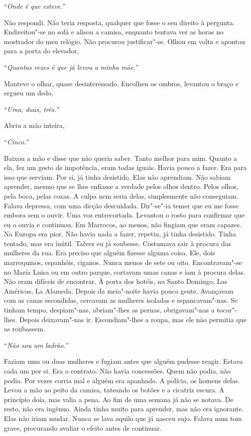 ``\emph{Onde é que esteve.}''

Não respondi. Não teria resposta, qualquer que fosse o seu direito à
pergunta. Endireitou"-se no sofá e alisou a camisa, enquanto tentava ver
as horas no mostrador do meu relógio. Não procurou justificar"-se. Olhou
em volta e apontou para a porta do elevador,

``\emph{Quantas vezes é que já levou a minha mãe.}''

Manteve o olhar, quase desinteressado. Encolheu os ombros, levantou o
braço e ergueu um dedo,

``\emph{Uma, duas, três.''}

Abriu a mão inteira,

``\emph{Cinco.}''

Baixou a mão e disse que não queria saber. Tanto melhor para mim. Quanto
a ela, fez um gesto de impotência, eram todas iguais. Havia pouco a
fazer. Era para isso que serviam. Por si, já tinha desistido. Elas não
aprendiam. Não sabiam aprender, mesmo que se lhes enfiasse a verdade
pelos olhos dentro. Pelos olhos, pela boca, pelas coxas. A culpa nem
seria delas, simplesmente não conseguiam. Falava depressa, com uma
dicção descuidada. Dir"-se"-ia temer que eu me fosse embora sem o ouvir.
Uma voz entrecortada. Levantou o rosto para confirmar que eu o ouvia e
continuou. Em Marrocos, ao menos, não fingiam que eram capazes. Na
Europa era pior. Não havia nada a fazer, repetiu, já tinha desistido.
Tinha tentado, mas era inútil. Talvez eu já soubesse. Costumava sair à
procura das mulheres da rua. Era preciso que alguém fizesse alguma
coisa. Ele, dois marroquinos, espanhóis, ciganos. Nunca menos de sete ou
oito. Encontravam"-se no María Luisa ou em outro parque, cortavam umas
canas e iam à procura delas. Não eram difíceis de encontrar. À porta dos
hotéis, na Santo Domingo, Las Américas, La Alameda. Depois da
meia"-noite havia pouca gente. Avançavam com as canas escondidas,
cercavam as mulheres isoladas e espancavam"-nas. Se tinham tempo,
despiam"-nas, abriam"-lhes as pernas, obrigavam"-nas a tocar"-lhes.
Depois deixavam"-nas ir. Escondiam"-lhes a roupa, mas ele não permitia
que as roubassem.

``\emph{Não sou um ladrão.''}

Faziam uma ou duas mulheres e fugiam antes que alguém pudesse reagir.
Estava cada um por si. Era o contrato. Não havia concessões. Quem não
podia, não podia. Por vezes corria mal e alguém era apanhado. A polícia,
os homens delas. Levou a mão ao peito da camisa, tateando os botões e a
cicatriz escura. A princípio doía, mas valia a pena. Ao fim de uma
semana já não se notava. De resto, não era ingênuo. Ainda tinha muito
para aprender, mas não era ignorante. Elas não iriam mudar. Nunca se
lava aquilo que já nasceu sujo. Falava num tom grave, procurando avaliar
o efeito antes de continuar.

